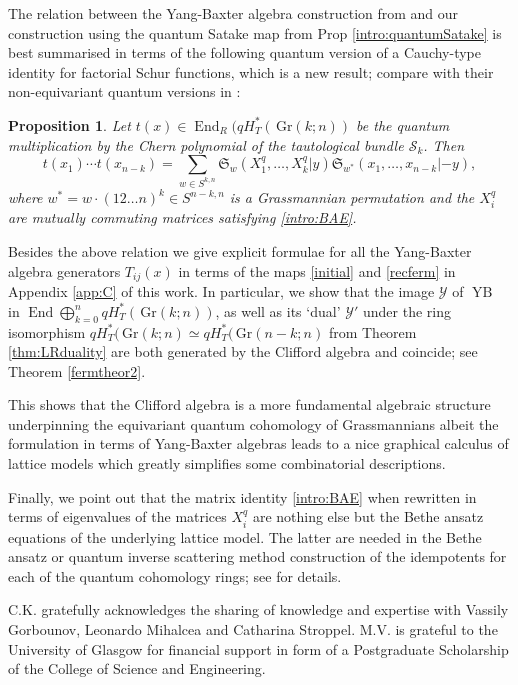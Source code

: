 \documentclass[12pt]{amsart}
\newcommand{\Gr}{\,\mathrm{Gr}}
\newcommand{\fS}{\mathfrak{S}}
\newcommand{\End}{\operatorname{End}}
\newcommand{\mc}[1]{\mathcal{#1}}
\newcommand{\ring}{R}
\newtheorem{prop}{Proposition}[section]
\numberwithin{equation}{section}
\numberwithin{figure}{section}
\newcommand{\YB}{\operatorname{YB}}
\begin{document}
The relation between the Yang-Baxter algebra construction from \cite{GKS20} and our construction using the quantum Satake map from Prop \ref{intro:quantumSatake} is best summarised in terms of the following quantum version of a Cauchy-type identity for factorial Schur functions, which is a new result; compare with their non-equivariant quantum versions in \cite[Lemma 5.1 and Cor.5.40]{korff2020cylindric}:
\begin{prop}
    Let $t(x)\in\End_{\ring}(qH^*_T(\Gr(k;n))$ be the quantum multiplication by the Chern polynomial of the tautological bundle $\mc{S}_k$. Then
    \[
    t(x_1)\cdots t(x_{n-k})=\sum_{w\in S^{k,n}}\fS_w(X_1^q,\ldots,X^q_k|y)\fS_{w^*}(x_1,\ldots,x_{n-k}|-y),
    \]
    where $w^* = w \cdot (12\ldots n)^{k}\in S^{n-k,n}$ is a Grassmannian permutation and the $X^q_i$ are mutually commuting matrices satisfying \eqref{intro:BAE}.
\end{prop}
Besides the above relation we give explicit formulae for all the Yang-Baxter algebra generators $T_{ij}(x)$ in terms of the maps \eqref{initial} and \eqref{recferm} in Appendix \ref{app:C} of this work. In particular, we show that the image $\mc{Y}$ of $\YB$ in $\End \bigoplus_{k=0}^nqH_T^*(\Gr(k;n))$, as well as its `dual' $\mc{Y}'$ under the ring isomorphism $qH^*_T(\Gr(k;n)\simeq qH^*_T(\Gr(n-k;n)$ from Theorem \ref{thm:LRduality} are both generated by the Clifford algebra and coincide; see Theorem \ref{fermtheor2}.

This shows that the Clifford algebra is a more fundamental algebraic structure underpinning the equivariant quantum cohomology of Grassmannians albeit the formulation in terms of Yang-Baxter algebras leads to a nice graphical calculus of lattice models which greatly simplifies some combinatorial descriptions. 

Finally, we point out that the matrix identity \eqref{intro:BAE} when rewritten in terms of eigenvalues of the matrices $X_i^q$ are nothing else but the Bethe ansatz equations of the underlying lattice model. The latter are needed in the Bethe ansatz or quantum inverse scattering method construction of the idempotents for each of the quantum cohomology rings; see \cite{korff2014quantum,gorbounovkorff2014,GKS20} for details.

\bigskip
{} C.K. gratefully acknowledges the sharing of knowledge and expertise with Vassily Gorbounov, Leonardo Mihalcea and Catharina Stroppel. M.V.  is grateful to the University of Glasgow for financial support in form of a Postgraduate Scholarship of the College of Science and Engineering.
\end{document}
